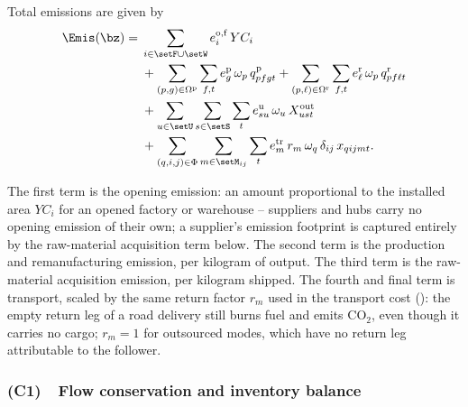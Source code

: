 Total emissions are given by
\begin{align}
\Emis(\bz)
={}&
  \sum_{i\in\setF\cup\setW} e^{\mathrm{o,f}}_i\,YC_i
\nonumber\\
&+
  \sum_{(p,g)\in\Omega^{\mathrm{p}}}\sum_{f,t}
     e^{\mathrm{p}}_g\,\omega_p\,q^{\mathrm{p}}_{pfgt}
   +\sum_{(p,\ell)\in\Omega^{\mathrm{r}}}\sum_{f,t}
     e^{\mathrm{r}}_{\ell}\,\omega_p\,q^{\mathrm{r}}_{pf\ell t}
\nonumber\\
&+
  \sum_{u\in\setU}\sum_{s\in\setS}\sum_{t}
     e^{\mathrm{u}}_{su}\,\omega_u\,X^{\mathrm{out}}_{ust}
\nonumber\\
&+
  \sum_{(q,i,j)\in\Phi}\sum_{m\in\setM_{ij}}\sum_{t}
     e^{\mathrm{tr}}_m\,r_m\,\omega_q\,\delta_{ij}\,x_{qijmt}.
\label{eq:emissions}
\end{align}

The first term is the opening emission: an amount proportional to the
installed area $YC_i$ for an opened factory or warehouse -- suppliers
and hubs carry no opening emission of their own; a supplier's emission
footprint is captured entirely by the raw-material acquisition term
below. The second term is the production and
remanufacturing emission, per kilogram of output.
The third term is the raw-material acquisition
emission, per kilogram shipped. The fourth and final term is transport,
scaled by the same return factor $r_m$ used in the transport cost
(): the empty return leg of a road delivery still burns
fuel and emits CO$_2$, even though it carries no cargo; $r_m=1$ for
outsourced modes, which have no return leg attributable to the
follower.

\subsubsection{(C1)~~Flow conservation and inventory balance}
\label{sec:model:c1}


